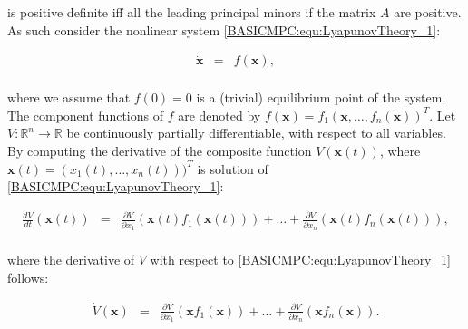 	is positive definite iff all the leading principal minors if the matrix $A$ are positive. As such consider the nonlinear system \ref{BASICMPC:equ:LyapunovTheory_1}:
	
	\begin{equation}
        \begin{array}{rcl}
				\boldsymbol{\dot{x}}&=&f(\boldsymbol{x}),\\
        \end{array}
        \label{BASICMPC:equ:LyapunovTheory_1}
    \end{equation}
	
	where we assume that $f(0)=0$ is a (trivial) equilibrium point of the system. The component functions of $f$ are denoted by $f(\boldsymbol{x})=f_1(\boldsymbol{x},\dots,f_n(\boldsymbol{x}))^T$. Let $V:\mathbb{R}^n\longrightarrow\mathbb{R}$ be continuously partially differentiable, with respect to all variables. By computing the derivative of the composite function $V(\boldsymbol{x}(t))$, where $\boldsymbol{x}(t)=(x_1(t),\dots,x_n(t)))^T$ is solution of \ref{BASICMPC:equ:LyapunovTheory_1}:
	
	\begin{equation}
        \begin{array}{rcl}
				\frac{dV}{dt}(\boldsymbol{x}(t))&=&\frac{\partial V}{\partial x_1}(\boldsymbol{x}(t)f_1(\boldsymbol{x}(t)))+\dots+\frac{\partial V}{\partial x_n}(\boldsymbol{x}(t)f_n(\boldsymbol{x}(t))),\\
        \end{array}
        \label{BASICMPC:equ:LyapunovTheory_2}
    \end{equation}
		
		where the derivative of $V$ with respect to \ref{BASICMPC:equ:LyapunovTheory_1} follows:
		
		\begin{equation}
        \begin{array}{rcl}
				\dot{V}(\boldsymbol{x})&=&\frac{\partial V}{\partial x_1}(\boldsymbol{x}f_1(\boldsymbol{x}))+\dots+\frac{\partial V}{\partial x_n}(\boldsymbol{x}f_n(\boldsymbol{x})).\\
        \end{array}
        \label{BASICMPC:equ:LyapunovTheory_3}
    \end{equation}
		
